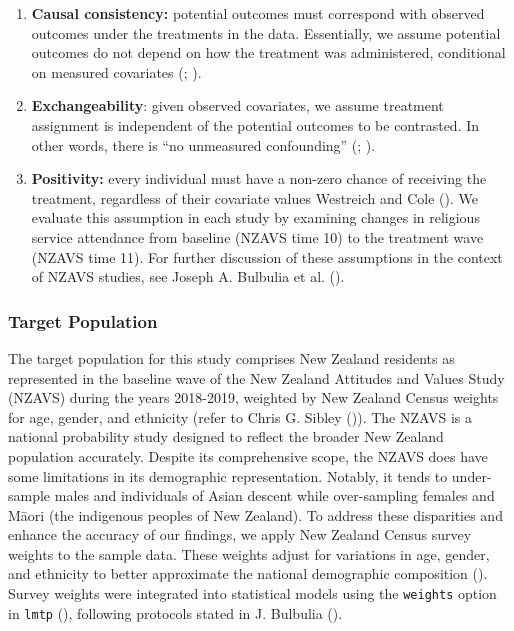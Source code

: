 \documentclass[
  single column]{article}
\begin{document}
\begin{enumerate}
\def\labelenumi{\arabic{enumi}.}
\item
  \textbf{Causal consistency:} potential outcomes must correspond with
  observed outcomes under the treatments in the data. Essentially, we
  assume potential outcomes do not depend on how the treatment was
  administered, conditional on measured covariates
  (;
  ).
\item
  \textbf{Exchangeability}: given observed covariates, we assume
  treatment assignment is independent of the potential outcomes to be
  contrasted. In other words, there is ``no unmeasured confounding''
  (;
  ).
\item
  \textbf{Positivity:} every individual must have a non-zero chance of
  receiving the treatment, regardless of their covariate values
  Westreich and Cole (). We evaluate
  this assumption in each study by examining changes in religious
  service attendance from baseline (NZAVS time 10) to the treatment wave
  (NZAVS time 11). For further discussion of these assumptions in the
  context of NZAVS studies, see Joseph A. Bulbulia et al.
  ().
\end{enumerate}

\subsubsection{Target Population}\label{target-population}

The target population for this study comprises New Zealand residents as
represented in the baseline wave of the New Zealand Attitudes and Values
Study (NZAVS) during the years 2018-2019, weighted by New Zealand Census
weights for age, gender, and ethnicity (refer to Chris G. Sibley
()). The NZAVS is a national probability
study designed to reflect the broader New Zealand population accurately.
Despite its comprehensive scope, the NZAVS does have some limitations in
its demographic representation. Notably, it tends to under-sample males
and individuals of Asian descent while over-sampling females and Māori
(the indigenous peoples of New Zealand). To address these disparities
and enhance the accuracy of our findings, we apply New Zealand Census
survey weights to the sample data. These weights adjust for variations
in age, gender, and ethnicity to better approximate the national
demographic composition (). Survey weights were integrated into statistical models using the
\texttt{weights} option in \texttt{lmtp}
(), following
protocols stated in J. Bulbulia
().
\end{document}
